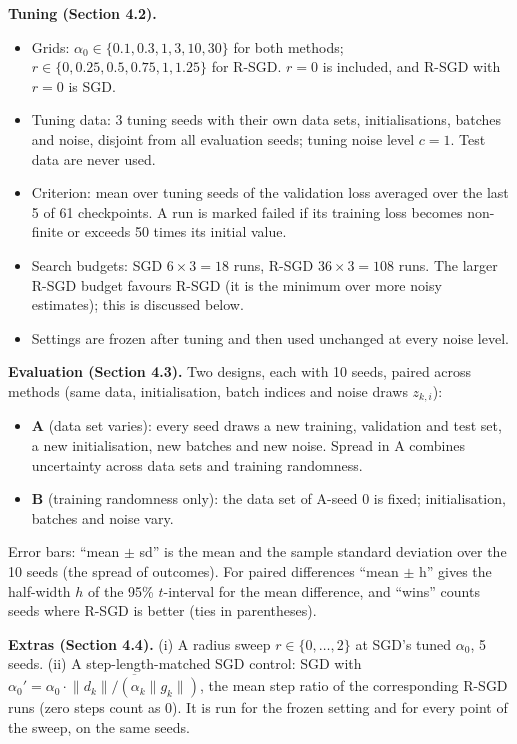 \documentclass[11pt,a4paper]{article}
\begin{document}
\textbf{Tuning (Section 4.2).}
\begin{itemize}
\item Grids: $\alpha_0\in\{0.1,0.3,1,3,10,30\}$ for both methods; $r\in\{0,0.25,0.5,0.75,1,1.25\}$
for R-SGD. $r=0$ is included, and R-SGD with $r=0$ is SGD.
\item Tuning data: 3 tuning seeds with their own data sets, initialisations, batches and noise,
disjoint from all evaluation seeds; tuning noise level $c=1$. Test data are never used.
\item Criterion: mean over tuning seeds of the validation loss averaged over the last 5 of 61
checkpoints. A run is marked failed if its training loss becomes non-finite or exceeds 50 times
its initial value.
\item Search budgets: SGD $6\times3=18$ runs, R-SGD $36\times3=108$ runs. The larger R-SGD
budget favours R-SGD (it is the minimum over more noisy estimates); this is discussed below.
\item Settings are frozen after tuning and then used unchanged at every noise level.
\end{itemize}

\textbf{Evaluation (Section 4.3).} Two designs, each with 10 seeds, paired across methods
(same data, initialisation, batch indices and noise draws $z_{k,i}$):
\begin{itemize}
\item \textbf{A} (data set varies): every seed draws a new training, validation and test set,
a new initialisation, new batches and new noise. Spread in A combines uncertainty across data
sets and training randomness.
\item \textbf{B} (training randomness only): the data set of A-seed 0 is fixed; initialisation,
batches and noise vary.
\end{itemize}
Error bars: ``mean $\pm$ sd'' is the mean and the sample standard deviation over the 10 seeds
(the spread of outcomes). For paired differences ``mean $\pm$ h'' gives the half-width $h$ of
the 95\% $t$-interval for the mean difference, and ``wins'' counts seeds where R-SGD is better
(ties in parentheses).

\textbf{Extras (Section 4.4).} (i) A radius sweep $r\in\{0,\dots,2\}$ at SGD's tuned $\alpha_0$,
5 seeds. (ii) A step-length-matched SGD control: SGD with
$\alpha_0'=\alpha_0\cdot\overline{\|d_k\|/(\alpha_k\|g_k\|)}$, the mean step ratio of the
corresponding R-SGD runs (zero steps count as 0). It is run for the frozen setting and for every
point of the sweep, on the same seeds.
\end{document}
